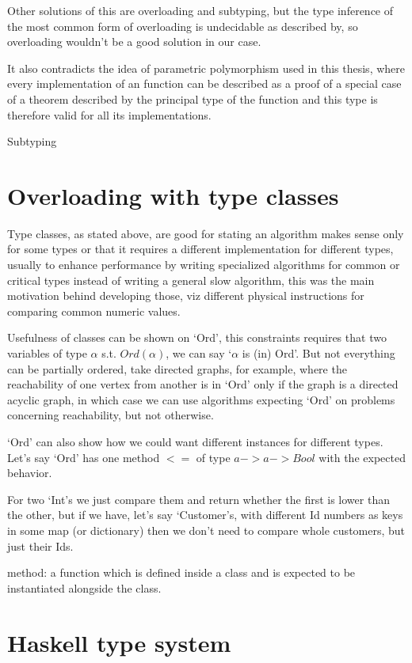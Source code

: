 Other solutions of this are overloading and subtyping, but the type inference of the most common form of overloading is undecidable
as described by, so overloading wouldn't be a good solution in our case. %

It also contradicts the idea of parametric polymorphism used in this thesis, where every implementation of an function can be
described as a proof of a special case of a theorem described by the principal type of the function and this type is therefore
valid for all its implementations.

Subtyping %

\section{Overloading with type classes}

Type classes, as stated above, are good for stating an algorithm makes sense only for some types or that it requires a different implementation for
different types, usually to enhance performance by writing specialized algorithms for common or critical types instead of writing a general slow algorithm,
this was the main motivation behind developing those, %
viz different physical instructions for comparing common numeric values.

Usefulness of classes can be shown on `Ord', this constraints requires that two variables of type $\alpha$ s.t. $Ord(\alpha)$, we can say `$\alpha$ is (in) Ord'.
But not everything can be partially ordered, take directed graphs, for example, where the reachability of one vertex from another is in `Ord' only
if the graph is a directed acyclic graph, in which case we can use algorithms expecting `Ord' on problems concerning reachability, but not otherwise.

`Ord' can also show how we could want different instances for different types.
Let's say `Ord' has one method $<=$ of type $a -> a -> Bool$ with the expected behavior. %

For two `Int's we just compare them and return whether the first is lower than the other,
but if we have, let's say `Customer's, with different Id numbers as keys in some map (or dictionary) then we don't need to compare whole customers,
but just their Ids.

method: a function which is defined inside a class and is expected to be instantiated alongside the class. %



\section{Haskell type system}


